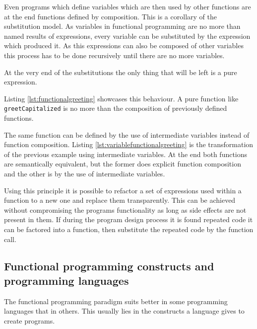 \documentclass[../main.tex]{subfiles}
\begin{document}
Even programs which define variables which are then used by other functions are
at the end functions defined by composition. This is a corollary of the
substitution model. As variables in functional programming are no more than
named results of expressions, every variable can be substituted by the expression
which produced it. As this expressions can also be composed of other variables
this process has to be done recursively until there are no more variables.

At the very end of the substitutions the only thing that will be left is a pure
expression.

Listing \ref{lst:functionalgreeting} showcases this behaviour. A pure function
like \texttt{greetCapitalized} is no more than the composition of previously defined
functions.



The same function can be defined by the use of intermediate variables instead of
function composition. Listing \ref{lst:variablefunctionalgreeting} is the
transformation of the previous example using intermediate variables. At the end
both functions are semantically equivalent, but the former does explicit
function composition and the other is by the use of intermediate variables.



Using this principle it is possible to refactor a set of expressions used within
a function to a new one and replace them transparently. This can be achieved
without compromising the programs functionality as long as side effects are not
present in them. If during the program design process it is found repeated code
it can be factored into a function, then substitute the repeated code by the
function call.

\subsection{Functional programming constructs and programming languages} The
functional programming paradigm suits better in some programming languages that
in others. This usually lies in the constructs a language gives to create
programs.
\end{document}
